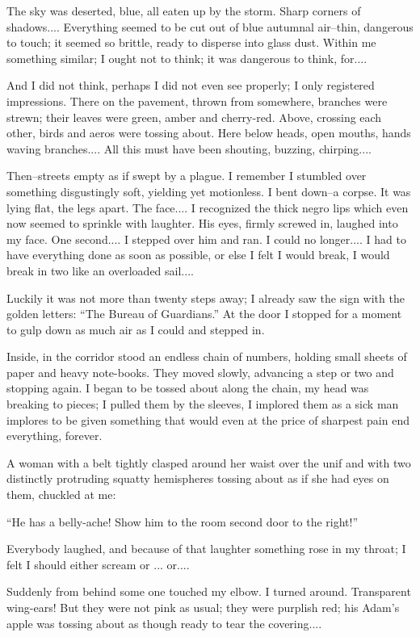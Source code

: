 \documentclass[11pt,openany]{book}
\begin{document}
The sky was deserted, blue, all eaten up by the storm. Sharp corners of shadows.... Everything seemed to be cut out of blue autumnal air--thin, dangerous to touch; it seemed so brittle, ready to disperse into glass dust. Within me something similar; I ought not to think; it was dangerous to think, for....

And I did not think, perhaps I did not even see properly; I only registered impressions. There on the pavement, thrown from somewhere, branches were strewn; their leaves were green, amber and cherry-red. Above, crossing each other, birds and aeros were tossing about. Here below heads, open mouths, hands waving branches.... All this must have been shouting, buzzing, chirping....

Then--streets empty as if swept by a plague. I remember I stumbled over something disgustingly soft, yielding yet motionless. I bent down--a corpse. It was lying flat, the legs apart. The face.... I recognized the thick negro lips which even now seemed to sprinkle with laughter. His eyes, firmly screwed in, laughed into my face. One second.... I stepped over him and ran. I could no longer.... I had to have everything done as soon as possible, or else I felt I would break, I would break in two like an overloaded sail....

Luckily it was not more than twenty steps away; I already saw the sign with the golden letters: ``The Bureau of Guardians.'' At the door I stopped for a moment to gulp down as much air as I could and stepped in.

Inside, in the corridor stood an endless chain of numbers, holding small sheets of paper and heavy note-books. They moved slowly, advancing a step or two and stopping again. I began to be tossed about along the chain, my head was breaking to pieces; I pulled them by the sleeves, I implored them as a sick man implores to be given something that would even at the price of sharpest pain end everything, forever.

A woman with a belt tightly clasped around her waist over the unif and with two distinctly protruding squatty hemispheres tossing about as if she had eyes on them, chuckled at me:

``He has a belly-ache! Show him to the room second door to the right!''

Everybody laughed, and because of that laughter something rose in my throat; I felt I should either scream or ... or....

Suddenly from behind some one touched my elbow. I turned around. Transparent wing-ears! But they were not pink as usual; they were purplish red; his Adam's apple was tossing about as though ready to tear the covering....
\end{document}
